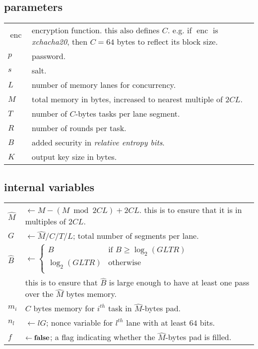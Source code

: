 \documentclass[twocolumn]{article}
\DeclareMathOperator{\enc}{enc}
\begin{document}
\subsection{parameters}
\begin{tabular}{lp{7.5cm}}
    $\enc$ & encryption function.  this also defines $C$.  e.g. if $\enc$
    is \emph{xchacha20}, then $C=64$ bytes to reflect its block size.\\
    $p$ & password.\\
    $s$ & salt.\\
    $L$ & number of memory lanes for concurrency.\\
    $M$ & total memory in bytes, increased to nearest multiple of $2CL$.\\
    $T$ & number of $C$-bytes tasks per lane segment.\\
    $R$ & number of rounds per task.\\
    $B$ & added security in \emph{relative entropy bits}.\\
    $K$ & output key size in bytes.\\
\end{tabular}

\subsection{internal variables}
\begin{tabular}{lp{7.5cm}}
    $\hat M$   & $\gets M - (M \bmod 2CL) + 2CL$.  this is to ensure that
    it is in multiples of $2CL$.\\
    $G$   & $\gets \hat M/C/T/L$; total number of segments per lane.\\
    $\hat B$& $\gets \begin{cases}
                    B & \text{if } B \ge \log_2(GLTR)\\
                    \log_2(GLTR) & \text{otherwise}\\
                 \end{cases}$\\
            & this is to ensure that $\hat B$ is large enough to have at
            least one pass over the $\hat M$ bytes memory.\\
    $m_i$ & $C$ bytes memory for $i^{th}$ task in $\hat M$-bytes pad.\\
    $n_l$ & $\gets lG$; nonce variable for $l^{th}$ lane with
    at least $64$ bits.\\
    $f$   & $\gets {\bf false}$; a flag indicating whether the $\hat
    M$-bytes pad is filled.\\
\end{tabular}
\end{document}
